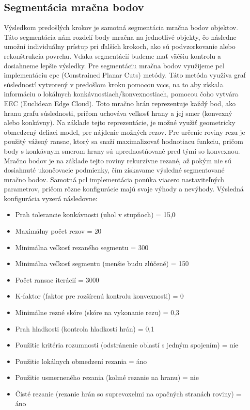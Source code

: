 \subsection{Segmentácia mračna bodov}
\noindent Výsledkom predošlých krokov je samotná segmentácia mračna bodov objektov. Táto segmentácia nám rozdelí body mračna na jednotlivé objekty, čo následne umožní individuálny prístup pri ďalších krokoch, ako sú podvzorkovanie alebo rekonštrukcia povrchu. Vďaka segmentácií budeme mať väčšiu kontrolu a dosiahneme lepšie výsledky.
\newline\indent Pre segmentáciu mračna bodov využijeme \acrshort{pcl} implementáciu \acrshort{cpc} (Constrained Planar Cuts) metódy. Táto metóda využíva graf súsledností vytvorený v predošlom kroku pomocou \acrshort{vccs}, na to aby získala informáciu o lokálnych konkávnostiach/konvexnostiach, pomocou čoho vytvára EEC (Euclidean Edge Cloud). Toto mračno hrán reprezentuje každý bod, ako hranu grafu súslednosti, pričom uchováva veľkosť hrany a jej smer (konvexný alebo konkávny). Na základe tejto reprezentácie, je možné využiť geometricky obmedzený deliaci model, pre nájdenie možných rezov. Pre určenie roviny rezu je použitý vážený \acrshort{ransac}, ktorý sa snaží maximalizovať hodnotiacu funkciu, pričom body s konkávnym smerom hrany sú uprednostňované pred tými so konvexnou. Mračno bodov je na základe tejto roviny rekurzívne rezané, až pokým nie sú dosiahnuté ukončovacie podmienky, čím získavame výsledné segmentované mračno bodov. \cite{CPCsegmentation}
\newline\indent Samotná \acrshort{pcl} implementácia ponúka viacero nastaviteľných parametrov, pričom rôzne konfigurácie majú svoje výhody a nevýhody. Výsledná konfigurácia vyzerá následovne:

\begin{itemize}
    \setlength\itemsep{0.1em}
    \item Prah tolerancie konkávnosti (uhol v stupňoch) = 15,0
    \item Maximálny počet rezov = 20
    \item Minimálna veľkosť rezaného segmentu = 300
    \item Minimálna veľkosť segmentu (menšie budu zlúčené) = 150
    \item Počet \acrshort{ransac} iterácií = 3000
    \item K-faktor (faktor pre rozšírenú kontrolu konvexnosti) = 0
    \item Minimálne rezné skóre (skóre na vykonanie rezu) = 0,3
    \item Prah hladkosti (kontrola hladkosti hrán) = 0,1
    \item Použitie kritéria rozumnosti (odstránenie oblastí s jedným spojením) = nie
    \item Použitie lokálnych obmedzení rezania = áno
    \item Použitie usmerneného rezania (kolmé rezanie na hranu) = nie
    \item Čisté rezanie (rezanie hrán so suprevoxelmi na opačných stranách roviny) = áno
\end{itemize}


